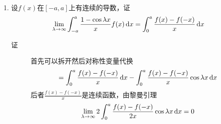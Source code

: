 \begin{enumerate}
\item 设$f(x)$在$[-a,a]$上有连续的导数，证
\[
\lim_{\lambda \to \infty}\int_{-a}^a \frac{1-\cos\lambda x}{x}f(x)\,\mathrm{d} x=\int_0^a\frac{f(x)-f(-x)}{x}\,\mathrm{d} x
\]
\begin{description}
\item[证] 首先可以拆开然后对称性变量代换
\[
=\int_0^a\frac{f(x)-f(-x)}{x}\,\mathrm{d} x-\int_0^a\frac{f(x)-f(-x)}{x}\cos\lambda x\,\mathrm{d} x
\]
后者$\frac{f(x)-f(-x)}{x}$是连续函数，由黎曼引理
\[
\lim_{\lambda\to\infty}2\int_0^a\frac{f(x)-f(-x)}{2x}\cos\lambda x\,\mathrm{d} x=0
\]
\end{description}
















 
\end{enumerate}